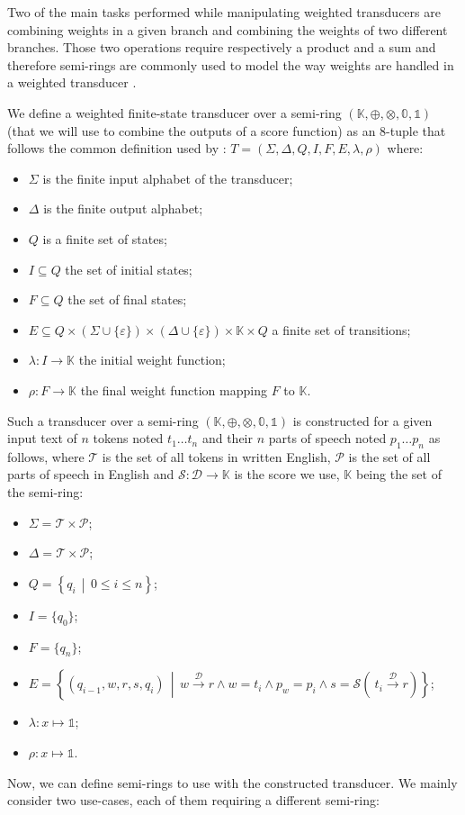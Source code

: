 \documentclass[a4paper, 11pt, onepage]{scrreprt}
\newcommand\maps[1]{\xrightarrow{\mathcal{#1}}}
\newcommand\suchthat{\, \middle| \,}
\begin{document}
Two of the main tasks performed while manipulating weighted
transducers are combining weights in a given branch and combining the
weights of two different branches. Those two operations require
respectively a product and a sum and therefore semi-rings are commonly
used to model the way weights are handled in a weighted transducer
\cite{mohri2004weighted}.

We define a weighted finite-state transducer over a semi-ring
$(\mathbb{K}, \oplus, \otimes, \mathbb{0}, \mathbb{1})$ (that we will
use to combine the outputs of a score function) as an 8-tuple that
follows the common definition used by \cite{mohri2004weighted}: $T =
(\Sigma, \Delta, Q, I, F, E, \lambda, \rho)$ where:
\begin{itemize}
\item $\Sigma$ is the finite input alphabet of the transducer;
\item $\Delta$ is the finite output alphabet;
\item $Q$ is a finite set of states;
\item $I \subseteq Q$ the set of initial states;
\item $F \subseteq Q$ the set of final states;
\item $E \subseteq Q \times (\Sigma \cup \{\varepsilon\}) \times
  (\Delta \cup \{\varepsilon\}) \times \mathbb{K} \times Q$ a finite
  set of transitions;
\item $\lambda : I \rightarrow \mathbb{K}$ the initial weight function;
\item $\rho : F \rightarrow \mathbb{K}$ the final weight function mapping
  $F$ to $\mathbb{K}$.
\end{itemize}
Such a transducer over a semi-ring $(\mathbb{K}, \oplus, \otimes,
\mathbb{0}, \mathbb{1})$ is constructed for a given input text of $n$
tokens noted $t_1 \dots t_n$ and their $n$ parts of speech noted $p_1
\dots p_n$ as follows, where $\mathcal{T}$ is the set of all tokens in
written English, $\mathcal{P}$ is the set of all parts of speech in
English and $\mathcal{S} : \mathcal{D} \rightarrow \mathbb{K}$ is the
score we use, $\mathbb{K}$ being the set of the semi-ring:
\begin{itemize}
\item $\Sigma = \mathcal{T} \times \mathcal{P}$;
\item $\Delta = \mathcal{T} \times \mathcal{P}$;
\item $Q = \left\{ q_i \suchthat 0 \leq i \leq n \right\}$;
\item $I = \{ q_0 \}$;
\item $F = \{ q_n \}$;
\item $E = \left\{ (q_{i - 1}, w, r, s, q_i) \suchthat w \maps{D} r
    \land w = t_i \land p_w = p_i \land s = \mathcal{S}\left(\ t_i
      \maps{D} r \right)\right\}$;
\item $\lambda : x \mapsto \mathbb{1}$;
\item $\rho : x \mapsto \mathbb{1}$.
\end{itemize}
Now, we can define semi-rings to use with the constructed
transducer. We mainly consider two use-cases, each of them requiring a
different semi-ring:
\end{document}
